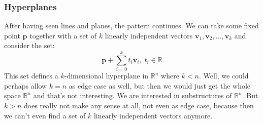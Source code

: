 \subsubsection{Hyperplanes}
After having seen lines and planes, the pattern continues. We can take some fixed point $\mathbf{p}$ together with a set of $k$ linearly independent vectors $\mathbf{v}_1, \mathbf{v}_2, \ldots, \mathbf{v}_k$ and consider the set:
\begin{equation}
 \mathbf{p} + \sum_{i=0}^{k} t_i \mathbf{v}_i, \; t_i \in \mathbb{R}
\end{equation}
This set defines a $k$-dimensional hyperplane in $\mathbb{R}^n$ where $k < n$. Well, we could perhaps allow $k=n$ as edge case as well, but then we would just get the whole space $\mathbb{R}^n$ and that's not interesting. We are interested in substructures of $\mathbb{R}^n$. But $k > n$ does really not make any sense at all, not even as edge case, because then we can't even find a set of $k$ linearly independent vectors anymore.












\begin{comment}


Geometrische Interpretation linearer Abbildungen
https://www.youtube.com/watch?v=EQ5Xct2YyLk

Signed Distance Functions & Ray-Marching
https://www.youtube.com/watch?v=hX3mazz8txo


Weitz: Analytische Geometrie
https://www.youtube.com/watch?v=7rkkHIjHtNI
https://www.youtube.com/watch?v=7rkkHIjHtNI&list=PLb0zKSynM2PBYzz6l37rWH3B_n_7P40QP

\end{comment}